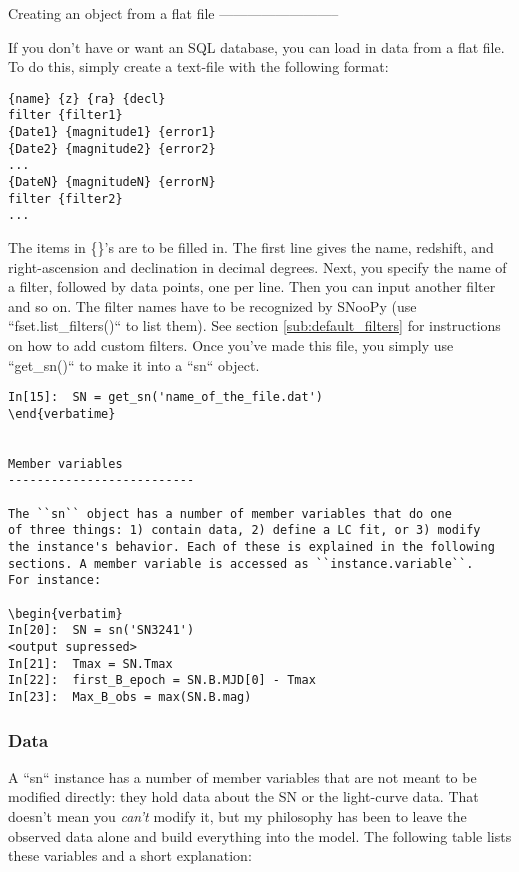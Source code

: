 Creating an object from a flat file\label{sub:flatfile}
--------------------------

If you don't have or want an SQL database, you can load in data from
a flat file. To do this, simply create a text-file with the following
format:

\begin{verbatim}
{name} {z} {ra} {decl}
filter {filter1}
{Date1} {magnitude1} {error1}
{Date2} {magnitude2} {error2}
...
{DateN} {magnitudeN} {errorN}
filter {filter2}
...
\end{verbatim}


The items in \{\}'s are to be filled in. The first line gives the
name, redshift, and right-ascension and declination in decimal degrees.
Next, you specify the name of a filter, followed by data points, one
per line. Then you can input another filter and so on. The filter
names have to be recognized by SNooPy (use ``fset.list_filters()``
to list them). See section \ref{sub:default_filters} for instructions
on how to add custom filters. Once you've made this file, you simply
use ``get_sn()`` to make it into a ``sn`` object.

\begin{verbatim}
In[15]:  SN = get_sn('name_of_the_file.dat')
\end{verbatime}


Member variables
--------------------------

The ``sn`` object has a number of member variables that do one
of three things: 1) contain data, 2) define a LC fit, or 3) modify
the instance's behavior. Each of these is explained in the following
sections. A member variable is accessed as ``instance.variable``.
For instance:

\begin{verbatim}
In[20]:  SN = sn('SN3241')
<output supressed>
In[21]:  Tmax = SN.Tmax
In[22]:  first_B_epoch = SN.B.MJD[0] - Tmax
In[23]:  Max_B_obs = max(SN.B.mag)
\end{verbatim}


\subsubsection{Data}

A ``sn`` instance has a number of member variables that are not
meant to be modified directly: they hold data about the SN or the
light-curve data. That doesn't mean you \emph{can't} modify it, but
my philosophy has been to leave the observed data alone and build
everything into the model. The following table lists these variables
and a short explanation:

